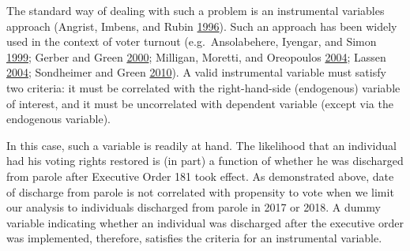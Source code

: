 \documentclass[12pt,]{article}
\begin{document}
The standard way of dealing with such a problem is an instrumental variables approach (Angrist, Imbens, and Rubin \protect\hyperlink{ref-Angrist1996}{1996}). Such an approach has been widely used in the context of voter turnout (e.g.~Ansolabehere, Iyengar, and Simon \protect\hyperlink{ref-Ansolabehere1999}{1999}; Gerber and Green \protect\hyperlink{ref-Gerber2000}{2000}; Milligan, Moretti, and Oreopoulos \protect\hyperlink{ref-Milligan2004}{2004}; Lassen \protect\hyperlink{ref-Lassen2004}{2004}; Sondheimer and Green \protect\hyperlink{ref-Sondheimer2010}{2010}). A valid instrumental variable must satisfy two criteria: it must be correlated with the right-hand-side (endogenous) variable of interest, and it must be uncorrelated with dependent variable (except via the endogenous variable).

In this case, such a variable is readily at hand. The likelihood that an individual had his voting rights restored is (in part) a function of whether he was discharged from parole after Executive Order 181 took effect. As demonstrated above, date of discharge from parole is not correlated with propensity to vote when we limit our analysis to individuals discharged from parole in 2017 or 2018. A dummy variable indicating whether an individual was discharged after the executive order was implemented, therefore, satisfies the criteria for an instrumental variable.
\end{document}
